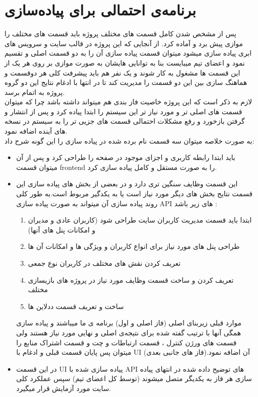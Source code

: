 \documentclass[10pt,a4paper]{article}
\begin{document}
\section{
برنامه‌ی احتمالی برای پیاده‌سازی
}
پس از مشخص شدن کامل قسمت های مختلف پروژه باید قسمت های مختلف را موازی پیش برد و آماده کرد.
از آنجایی که این پروژه در قالب سایت و سرویس های ابری پیاده سازی میشود میتوان قسمت پیاده سازی آن را به دو قسمت اصلی 
 و
 تقسیم نمود و اعضای تیم میبایست بنا به توانایی هایشان به صورت موازی بر روی هر یک از این قسمت ها مشغول به کار شوند و یک نفر هم باید پیشرفت کلی هر دوقسمت و هماهنگ سازی بین این دو قسمت را مدیریت کند تا در انتها با ادغام نتایج این دو گروه پروژه به اتمام برسد.\\
  لازم به ذکر است که این پروژه خاصیت فاز بندی هم میتواند داشته باشد چرا که میتوان قسمت های اصلی تر و مورد نیاز تر این سیستم را ابتدا پیاده کرد و پس از انتشار و گرفتن بازخورد و رفع مشکلات احتمالی قسمت های جزیی تر را به سیستم در نسخه های آینده اضافه نمود.\\
 به صورت خلاصه میتوان سه قسمت نام برده شده در پیاده سازی را این گونه شرح داد:
\begin{itemize}
	\item 
	{
\large	
{}
}
باید ابتدا رابطه کاربری و اجزای موجود در صفحه را طراحی کرد و پس از آن میتوان قسمت frontend را به صورت مستقل و کامل پیاده سازی کرد.
	\item 
{
	\large	
}
این قسمت وظایف سنگین تری دارد و در بعضی از بخش های پیاده سازی این قسمت نتایج بخش های دیگر مورد نیاز است یا به یکدگیر مربوط است.به طور کلی روند پیاده سازی آن میتواند به صورت پیاده سازی API های زیر باشد :
\begin{enumerate}
	\item
	ابتدا باید قسمت مدیریت کاربران سایت طراحی شود (کاربران عادی و مدیران و امکانات پنل های آنها)
	\item
	طراحی پنل های مورد نیاز برای انواع کاربران و ویژگی ها و امکانات آن ها
	\item
	تعریف کردن نقش های مختلف در کاربران نوع جمعی
	\item 
	تعریف کردن و ساخت قسمت وظایف مورد نیاز در پروژه های بازیسازی مختلف
	\item
	ساخت و تعریف قسمت ددلاین ها
\end{enumerate}
	موارد قبلی زیربنای اصلی (فاز اصلی و اول) برنامه ی ما میباشند و پیاده سازی همگی آنها با ترتیب گفته شده برای نتیجه‌ی اصلی و نهایی مورد نیاز هستند ولی قسمت های ورژن کنترل ، قسمت ارتباطات و چت و قسمت اشتراک منابع را میتوان پس پایان قسمت قبلی و ادغام با UI آن اضافه نمود.(فاز های جانبی بعدی)
	


	\item 
{
	\large	
}
در این قسمت UI پیاده سازی شده با API های توضیح داده شده در انتهای پیاده سازی هر فاز به یکدیگر متصل میشوند (توسط کل اعضای تیم) سپس عملکرد کلی سایت مورد آزمایش قرار میگیرد. ‌
\end{itemize}
\end{document}
